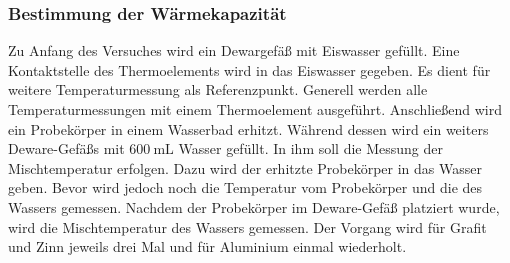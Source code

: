 \subsubsection{Bestimmung der Wärmekapazität}
Zu Anfang des Versuches wird ein Dewargefäß mit Eiswasser gefüllt.
Eine Kontaktstelle des Thermoelements wird in das Eiswasser gegeben.
Es dient für weitere Temperaturmessung als Referenzpunkt.
Generell werden alle Temperaturmessungen mit einem Thermoelement ausgeführt.
Anschließend wird ein Probekörper in einem Wasserbad erhitzt.
Während dessen wird ein weiters Deware-Gefäßs mit $\SI{600}{\milli\liter}$ Wasser gefüllt.
In ihm soll die Messung der Mischtemperatur erfolgen.
Dazu wird der erhitzte Probekörper in das Wasser geben.
Bevor wird jedoch noch die Temperatur vom Probekörper und die des Wassers gemessen.
Nachdem der Probekörper im Deware-Gefäß platziert wurde, wird die Mischtemperatur des
Wassers gemessen. Der Vorgang wird für Grafit und Zinn jeweils drei Mal und für
Aluminium einmal wiederholt.

